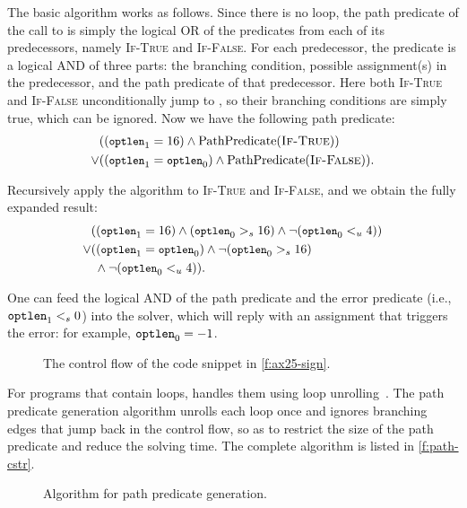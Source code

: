 The basic algorithm works as follows.  Since there is no loop, the
path predicate of the call to  is simply the
logical OR of the predicates from each of its predecessors, namely
\textsc{If-True} and \textsc{If-False}.  For each predecessor, the
predicate is a logical AND of three parts: the branching condition,
possible assignment(s) in the predecessor, and the path predicate
of that predecessor.  Here both \textsc{If-True} and \textsc{If-False}
unconditionally jump to , so their branching
conditions are simply true, which can be ignored.  Now we have the
following path predicate:
\newcommand{\optlen}{{\small \texttt{optlen}}}
\newcommand{\pc}{\textrm{PathPredicate}}
%
\begin{align*}
& ((\optlen_1 = 16) \land \pc(\textsc{If-True})) \\
\lor & ((\optlen_1 = \optlen_0) \land \pc(\textsc{If-False})).
\end{align*}

Recursively apply the algorithm to \textsc{If-True} and \textsc{If-False},
and we obtain the fully expanded result:
%
\begin{align*}
& ((\optlen_1 = 16) \land (\optlen_0 >_s 16)
    \land \neg(\optlen_0 <_u 4)) \\
\lor & ((\optlen_1 = \optlen_0) \land \neg(\optlen_0 >_s 16) \\
     & \; \land \neg(\optlen_0 <_u 4)).
\end{align*}

One can feed the logical AND of the path predicate and the error
predicate (i.e., $\texttt{optlen}_1 <_s 0$) into the solver, which
will reply with an assignment that triggers the error: for example,
$\texttt{optlen}_0 = -1$.

\begin{figure}
\centering
\resizebox{\linewidth}{!}{

}
\caption{The control flow of the code snippet in \autoref{f:ax25-sign}.}
\label{f:cfg}
\end{figure}

For programs that contain loops, \sys handles them using
loop unrolling~\cite{xie:saturn}.  The path
predicate generation algorithm unrolls each loop once and ignores
branching edges that jump back in the control flow,
so as to restrict the size of the path predicate
and reduce the solving time.
The complete algorithm is listed in \autoref{f:path-cstr}.

\begin{figure}

\caption{Algorithm for path predicate generation.}
\label{f:path-cstr}
\end{figure}

